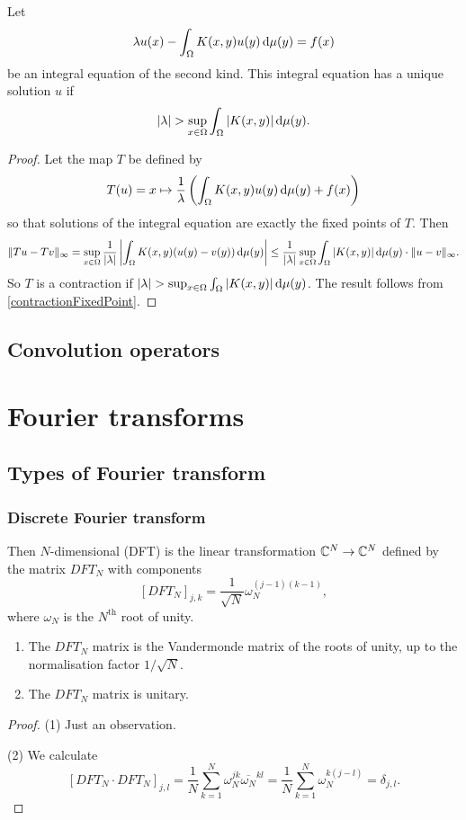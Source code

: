 \begin{proposition}
Let
\[ \lambda u(x) - \int_\Omega K(x,y)u(y)\operatorname{d \!}{\mu(y)} = f(x)\]
be an integral equation of the second kind. This integral equation has a unique solution $u$ if
\[ |\lambda| > \sup_{x\in \Omega} \int_{\Omega}|K(x,y)|\operatorname{d \!}{\mu(y)}. \]
\end{proposition}
\begin{proof}
Let the map $T$ be defined by
\[ T(u) = x\mapsto \frac{1}{\lambda}\left(\int_\Omega K(x,y)u(y)\operatorname{d \!}{\mu(y)} + f(x)\right) \]
so that solutions of the integral equation are exactly the fixed points of $T$. Then
\[ \lVert Tu-Tv\rVert_\infty = \sup_{x\in\Omega} \frac{1}{|\lambda|} \left|\int_\Omega K(x,y)(u(y)- v(y))\operatorname{d \!}{\mu(y)}\right| \leq \frac{1}{|\lambda|} \sup_{x\in \Omega} \int_{\Omega}|K(x,y)|\operatorname{d \!}{\mu(y)} \cdot \lVert u-v\rVert_\infty. \]
So $T$ is a contraction if $|\lambda| > \sup_{x\in \Omega} \int_{\Omega}|K(x,y)|\operatorname{d \!}{\mu(y)}$. The result follows from \ref{contractionFixedPoint}.
\end{proof}

\section{Convolution operators}






\chapter{Fourier transforms}

\section{Types of Fourier transform}

\subsection{Discrete Fourier transform}
\begin{definition}
Then $N$-dimensional  (DFT) is the linear transformation $\mathbb{C}^N \to \mathbb{C}^N$ defined by the matrix $DFT_N$ with components
\[ [DFT_N]_{j,k} = \frac{1}{\sqrt{N}}\omega_N^{(j-1)(k-1)}, \]
where $\omega_N$ is the $N^\text{th}$ root of unity.
\end{definition}

\begin{lemma} \mbox{}
\begin{enumerate}
\item The $DFT_N$ matrix is the Vandermonde matrix of the roots of unity, up to the normalisation factor $1/\sqrt{N}$.
\item The $DFT_N$ matrix is unitary.
\end{enumerate}
\end{lemma}
\begin{proof}
(1) Just an observation.

(2) We calculate
\[ [DFT_N\cdot DFT_N]_{j,l} = \frac{1}{N}\sum_{k=1}^N\omega_N^{jk}\overline{\omega_N}^{kl} = \frac{1}{N}\sum_{k=1}^N\omega_N^{k(j-l)} = \delta_{j,l}. \]
\end{proof}


